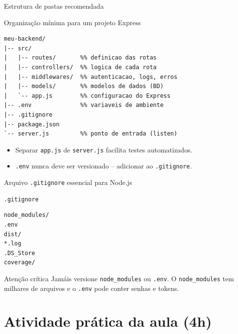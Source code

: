 \documentclass[aspectratio=169]{beamer}
\newcommand{\code}[1]{\texttt{#1}}
\begin{document}
\begin{frame}[fragile]{Estrutura de pastas recomendada}
\begin{block}{Organiza\c{c}\~ao m\'inima para um projeto Express}
\begin{lstlisting}
meu-backend/
|-- src/
|   |-- routes/       %% definicao das rotas
|   |-- controllers/  %% logica de cada rota
|   |-- middlewares/  %% autenticacao, logs, erros
|   |-- models/       %% modelos de dados (BD)
|   `-- app.js        %% configuracao do Express
|-- .env              %% variaveis de ambiente
|-- .gitignore
|-- package.json
`-- server.js         %% ponto de entrada (listen)
\end{lstlisting}
\end{block}
\begin{itemize}
  \item Separar \code{app.js} de \code{server.js} facilita testes automatizados.
  \item \code{.env} nunca deve ser versionado -- adicionar ao \code{.gitignore}.
\end{itemize}
\end{frame}

\begin{frame}[fragile]{Arquivo \code{.gitignore} essencial para Node.js}
\begin{block}{\code{.gitignore}}
\begin{lstlisting}
node_modules/
.env
dist/
*.log
.DS_Store
coverage/
\end{lstlisting}
\end{block}
\begin{alertblock}{Aten\c{c}\~ao cr\'itica}
Jam\'ais versione \code{node\_modules} ou \code{.env}. O \code{node\_modules} tem milhares de arquivos e o \code{.env} pode conter senhas e tokens.
\end{alertblock}
\end{frame}

\section{Atividade pr\'atica da aula (4h)}
\end{document}
